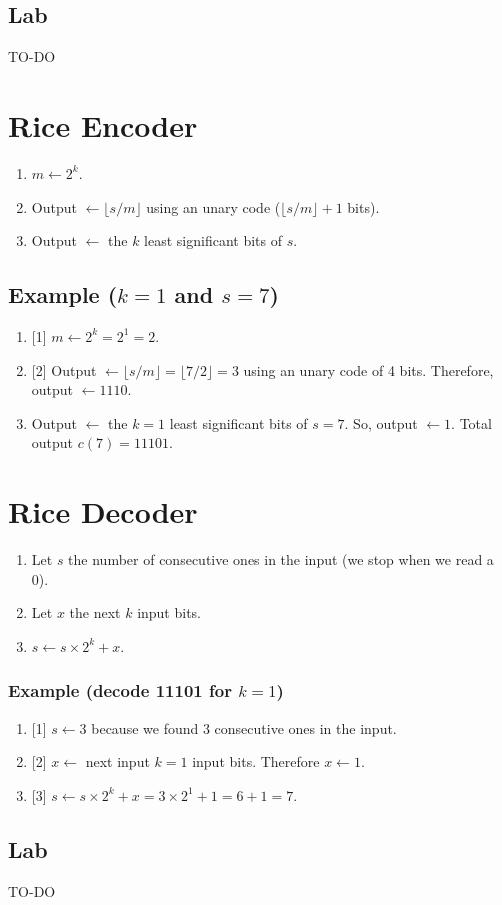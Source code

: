 \subsection{Lab}
TO-DO

\section{Rice Encoder}
\begin{enumerate}
\def\labelenumi{\arabic{enumi}.}
\tightlist
\item
  \(m\leftarrow 2^k\).
\item
  Output \(\leftarrow\lfloor s/m\rfloor\) using an unary code
  (\(\lfloor s/m\rfloor+1\) bits).
\item
  Output \(\leftarrow\) the \(k\) least significant bits of \(s\).
\end{enumerate}

\subsection{Example ($k=1$ and $s=7$)}
\begin{enumerate}
\def\labelenumi{\arabic{enumi}.}
\tightlist
\item
  {[}1{]} \(m\leftarrow 2^k=2^1=2\).
\item
  {[}2{]} Output \(\leftarrow \lfloor s/m\rfloor=\lfloor 7/2\rfloor=3\)
  using an unary code of 4 bits. Therefore, output \(\leftarrow 1110\).
\item
  Output \(\leftarrow\) the \(k=1\) least significant bits of \(s=7\).
  So, output \(\leftarrow 1\). Total output \(c(7)=11101\).
\end{enumerate}

\section{Rice Decoder}
\begin{enumerate}
\def\labelenumi{\arabic{enumi}.}
\tightlist
\item
  Let \(s\) the number of consecutive ones in the input (we stop when we
  read a 0).
\item
  Let \(x\) the next \(k\) input bits.
\item
  \(s\leftarrow s\times 2^k+x\).
\end{enumerate}

\subsubsection{Example (decode 11101 for $k=1$)}
\begin{enumerate}
\def\labelenumi{\arabic{enumi}.}
\tightlist
\item
  {[}1{]} \(s\leftarrow 3\) because we found \(3\) consecutive ones in
  the input.
\item
  {[}2{]} \(x\leftarrow\) next input \(k=1\) input bits. Therefore
  \(x\leftarrow 1\).
\item
  {[}3{]} \(s\leftarrow s\times 2^k+x = 3\times 2^1+1 = 6+1 = 7\).
\end{enumerate}

\subsection{Lab}
TO-DO


